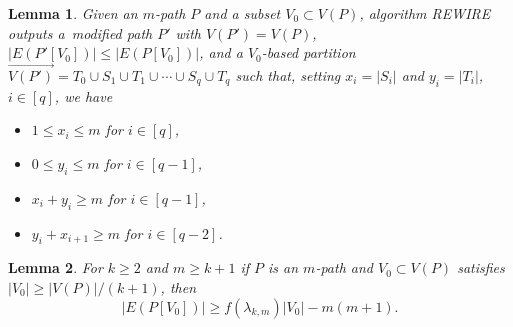 \documentclass[10pt,a4paper]{amsart}
\newtheorem{lemma}{Lemma}
\begin{document}
\begin{lemma}\label{perform}
Given an $m$-path $P$ and a subset $V_0\subset V(P)$, algorithm REWIRE outputs a~modified path $P'$ with $V(P')=V(P)$, $|E(P'[V_0])|\le |E(P[V_0])|$, and a $V_0$-based partition $\overrightarrow{V(P')} = T_0\cup S_1\cup T_1\cup\cdots\cup S_q\cup T_q$ such that, setting $x_i=|S_i|$ and $y_i=|T_i|$, $i\in[q]$, we have
\begin{itemize}
    \item[(i)] $1 \leq x_i \leq m$ for $i\in[q]$,
    \item[(ii)] $0 \leq y_i \leq m$ for $i\in[q-1]$,
    \item[(iii)] $x_i + y_i \geq m$ for $i\in[q-1]$,
    \item[(iv)] $y_i + x_{i+1} \geq m$ for $i\in[q-2]$.
\end{itemize}
\end{lemma}

\begin{lemma}\label{weak}
For $k\ge 2$ and $m\geq k+1$ if $P$ is an $m$-path and $V_0\subset V(P)$ satisfies
$|V_0|\ge|V(P)|/(k+1)$, then
\[
    |E(P[V_{0}])|\geq f(\lambda_{k,m})|V_{0}| -  m(m+1).
\]
\end{lemma}
\end{document}
